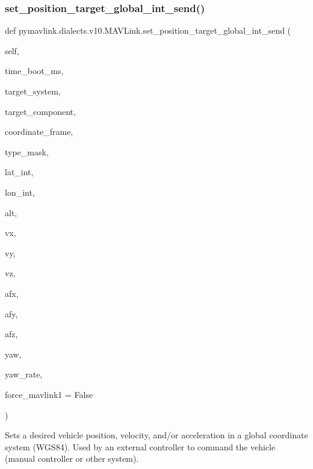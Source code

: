 \begin{DoxyVerb}
\begin{DoxyVerb}
\begin{DoxyVerb}
\begin{DoxyVerb}
\begin{DoxyVerb}
\begin{DoxyVerb}
\begin{DoxyVerb}
\begin{DoxyVerb}
\begin{DoxyVerb}
\begin{DoxyVerb}
\subsubsection{\texorpdfstring{set\+\_\+position\+\_\+target\+\_\+global\+\_\+int\+\_\+send()}{set\_position\_target\_global\_int\_send()}}
{\footnotesize\ttfamily def pymavlink.\+dialects.\+v10.\+M\+A\+V\+Link.\+set\+\_\+position\+\_\+target\+\_\+global\+\_\+int\+\_\+send (\begin{DoxyParamCaption}\item[{}]{self,  }\item[{}]{time\+\_\+boot\+\_\+ms,  }\item[{}]{target\+\_\+system,  }\item[{}]{target\+\_\+component,  }\item[{}]{coordinate\+\_\+frame,  }\item[{}]{type\+\_\+mask,  }\item[{}]{lat\+\_\+int,  }\item[{}]{lon\+\_\+int,  }\item[{}]{alt,  }\item[{}]{vx,  }\item[{}]{vy,  }\item[{}]{vz,  }\item[{}]{afx,  }\item[{}]{afy,  }\item[{}]{afz,  }\item[{}]{yaw,  }\item[{}]{yaw\+\_\+rate,  }\item[{}]{force\+\_\+mavlink1 = {\ttfamily False} }\end{DoxyParamCaption})}

\begin{DoxyVerb}Sets a desired vehicle position, velocity, and/or acceleration in a
global coordinate system (WGS84). Used by an external
controller to command the vehicle (manual controller
or other system).


\end{DoxyVerb}
\end{DoxyVerb}
\end{DoxyVerb}
\end{DoxyVerb}
\end{DoxyVerb}
\end{DoxyVerb}
\end{DoxyVerb}
\end{DoxyVerb}
\end{DoxyVerb}
\end{DoxyVerb}
\end{DoxyVerb}
